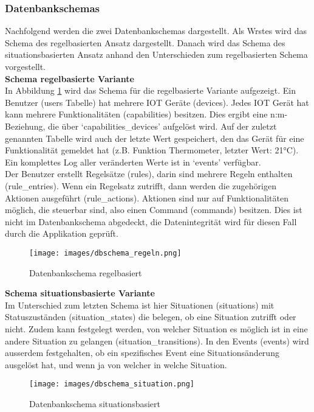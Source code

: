 \subsubsection{Datenbankschemas}
Nachfolgend werden die zwei Datenbankschemas dargestellt. Als Wrstes wird das Schema des regelbasierten Ansatz dargestellt. Danach wird das Schema des situationsbasierten Ansatz anhand den Unterschieden zum regelbasierten Schema vorgestellt.\\[2ex]
%
\textbf{Schema regelbasierte Variante}\\
In Abbildung \ref{fig:dbschema_regeln} wird das Schema für die regelbasierte Variante aufgezeigt. Ein Benutzer (\glqq users\grqq{} Tabelle) hat mehrere IOT Geräte (\glqq devices\grqq). Jedes IOT Gerät hat kann mehrere Funktionalitäten (\glqq capabilities\grqq) besitzen. Dies ergibt eine n:m-Beziehung, die über `capabilities\_devices' aufgelöst wird. Auf der zuletzt genannten Tabelle wird auch der letzte Wert gespeichert, den das Gerät für eine Funktionalität gemeldet hat (z.B. Funktion Thermometer, letzter Wert: 21°C). Ein komplettes Log aller veränderten Werte ist in `events' verfügbar.\\[2ex]
%
Der Benutzer erstellt Regelsätze (\glqq rules\grqq), darin sind mehrere Regeln enthalten (\glqq rule\_entries\grqq). Wenn ein Regelsatz zutrifft, dann werden die zugehörigen Aktionen ausgeführt (\glqq rule\_actions\grqq). Aktionen sind nur auf Funktionalitäten möglich, die steuerbar sind, also einen Command (\glqq commands\grqq) besitzen. Dies ist nicht im Datenbankschema abgedeckt, die Datenintegrität wird für diesen Fall durch die Applikation geprüft.
\begin{figure}[ht]
  \begin{center}
    \texttt{[image: images/dbschema\_regeln.png]}
    \caption[Datenbankschema regelbasiert]{Datenbankschema regelbasiert}
    \label{fig:dbschema_regeln}
  \end{center}
\end{figure}
\clearpage
%
\textbf{Schema situationsbasierte Variante}\\
Im Unterschied zum letzten Schema ist hier Situationen (\glqq situations\grqq) mit Statuszuständen (\glqq situation\_states\grqq) die belegen, ob eine Situation zutrifft oder nicht. Zudem kann festgelegt werden, von welcher Situation es möglich ist in eine andere Situation zu gelangen (\glqq situation\_transitions\grqq). In den Events (\glqq events\grqq) wird ausserdem festgehalten, ob ein spezifisches Event eine Situationsänderung ausgelöst hat, und wenn ja von welcher in welche Situation.
%
\begin{figure}[ht]
  \begin{center}
    \texttt{[image: images/dbschema\_situation.png]}
    \caption[Datenbankschema situationsbasiert]{Datenbankschema situationsbasiert}
    \label{fig:dbschema_situation}
  \end{center}
\end{figure}
%
\clearpage
%

